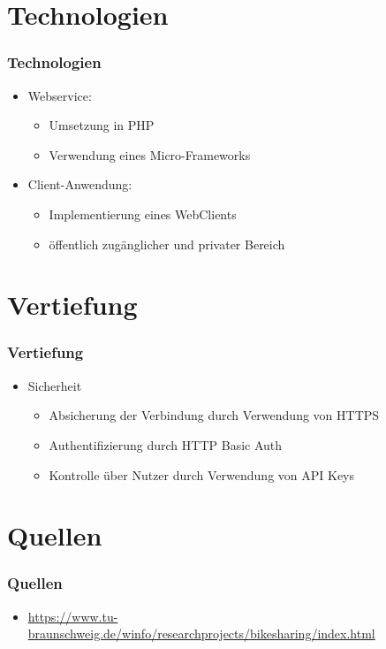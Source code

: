 \section{Technologien}
\begin{frame}
	\frametitle*{Technologien}
	\begin{itemize}
		\item Webservice:
			\begin{itemize}
				\item Umsetzung in PHP
				\item Verwendung eines Micro-Frameworks
			\end{itemize}
			
		\item Client-Anwendung:	
			\begin{itemize}
				\item Implementierung eines WebClients
				\item öffentlich zugänglicher und privater Bereich
			\end{itemize}
	\end{itemize}
\end{frame}

\section{Vertiefung}
\begin{frame}
	\frametitle*{Vertiefung}
	\begin{itemize}
		\item Sicherheit
			\begin{itemize}
				\item Absicherung der Verbindung durch Verwendung von HTTPS
				\item Authentifizierung durch HTTP Basic Auth
				\item Kontrolle über Nutzer durch Verwendung von API Keys
			\end{itemize}
	\end{itemize}
\end{frame}

\section{Quellen}
\begin{frame}
	\frametitle*{Quellen}
	\begin{itemize}
		\item \url{https://www.tu-braunschweig.de/winfo/researchprojects/bikesharing/index.html}
	\end{itemize}
\end{frame}
